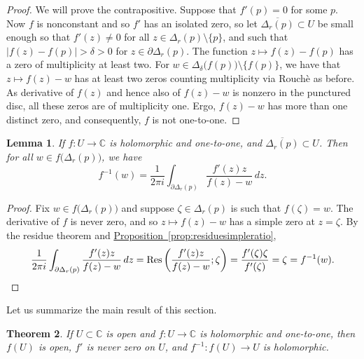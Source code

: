\documentclass[12pt,openany]{book}
\newcommand{\sabs}[1]{\lvert {#1} \rvert}
\newcommand{\C}{{\mathbb{C}}}
\theoremstyle{plain}
\newtheorem{thm}{Theorem}[section]
\newtheorem{lemma}[thm]{Lemma}
\theoremstyle{remark}
\theoremstyle{definition}
\theoremstyle{exercise}
\theoremstyle{example}
\newcommand{\propref}[1]{\hyperref[#1]{Proposition~\ref*{#1}}}
\begin{document}
\begin{proof}
We will prove the contrapositive.
Suppose that $f'(p) = 0$ for some $p$.
Now $f$ is nonconstant and so $f'$ has
an isolated zero, so let $\overline{\Delta_r(p)} \subset U$
be small enough so that $f'(z) \not= 0$ for all $z \in \Delta_r(p) \setminus \{ p \}$,
and such that $\sabs{f(z)-f(p)} > \delta > 0$ for $z \in \partial
\Delta_r(p)$.
The function $z \mapsto f(z) - f(p)$ has a zero of multiplicity at least
two.
For $w \in \Delta_{\delta}\bigl(f(p)\bigr) \setminus \bigl\{ f(p) \bigr\}$,
we have that
$z \mapsto f(z)-w$ has at least two zeros counting multiplicity via Rouch\`e as
before.  As derivative of $f(z)$ and hence also of $f(z)-w$ is nonzero in
the punctured disc, all these zeros are of multiplicity one.  Ergo, $f(z)-w$
has more than one distinct zero, and consequently, $f$ is not one-to-one.
\end{proof}

\begin{lemma} \label{lemma:inverseasintegral}
If $f \colon U \to \C$ is holomorphic and one-to-one, and
$\overline{\Delta_r(p)} \subset U$.  Then for all $w \in
f\bigl(\Delta_r(p)\bigr)$, we have
\begin{equation*}
f^{-1}(w) = \frac{1}{2\pi i} \int_{\partial \Delta_r(p)}
\frac{f'(z)z}{f(z)-w} \, dz .
\end{equation*}
\end{lemma}

\begin{proof}
Fix $w \in f\bigl(\Delta_r(p)\bigr)$ and suppose $\zeta \in \Delta_r(p)$
is such that $f(\zeta) = w$.
The derivative of $f$ is never zero, and so $z \mapsto f(z)-w$ has a simple
zero at $z=\zeta$.  By the residue theorem and
\propref{prop:residuesimpleratio},
\begin{equation*}
\frac{1}{2\pi i} \int_{\partial \Delta_r(p)}
\frac{f'(z)z}{f(z)-w} \, dz
=
\operatorname{Res}\left(\frac{f'(z)z}{f(z)-w};\zeta\right)
=
\frac{f'(\zeta)\zeta}{f'(\zeta)} = \zeta = f^{-1}(w) .
\qedhere
\end{equation*}
\end{proof}

Let us summarize the main result of this section.

\begin{thm}
If $U \subset \C$ is open and $f \colon U \to \C$ is holomorphic and
one-to-one, then $f(U)$ is open, $f'$ is never zero on $U$, and $f^{-1}
\colon f(U) \to U$ is holomorphic.
\end{thm}
\end{document}
